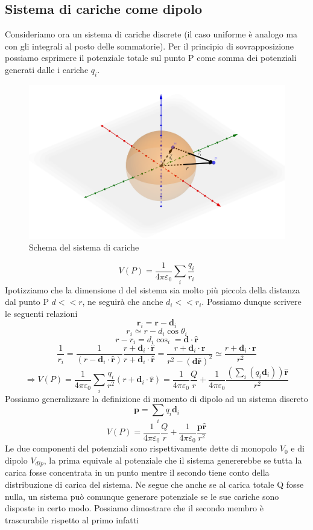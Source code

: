 \documentclass[
10pt, %
a4paper, %
oneside, %
headinclude,footinclude, %
BCOR5mm, %
]{scrartcl}
\begin{document}
\subsection{Sistema di cariche come dipolo}
Consideriamo ora un sistema di cariche discrete (il caso uniforme è analogo ma con gli integrali al posto delle sommatorie). Per il principio di sovrapposizione possiamo esprimere il potenziale totale sul punto P come somma dei potenziali generati dalle i cariche \(q_i\).
\begin{figure}[h!]
	\centering
	\includegraphics[width=0.9\linewidth]{../images/sistema_dipolo}
	\caption{Schema del sistema di cariche}
	\label{fig:sistemadipolo}
\end{figure}
\FloatBarrier
\[V(P) = \frac{1}{4\pi\varepsilon_0}\sum_i \frac{q_i}{r_i}\]
Ipotizziamo che la dimensione d del sistema sia molto più piccola della distanza dal punto P \(d<<r\), ne seguirà che anche \(d_i<<r_i\). Possiamo dunque scrivere le seguenti relazioni
 \[\mathbf{r}_i = \mathbf{r} - \mathbf{d}_i\]
 \[r_i \simeq r-d_i\cos\theta_i\]
 \[r-r_i = d_i\cos_i = \mathbf{d}\cdot\hat{\mathbf{r}}\]
 \[\frac{1}{r_i} = \frac{1}{(r-\mathbf{d}_i\cdot\hat{\mathbf{r}})}\frac{r+\mathbf{d}_i\cdot\hat{\mathbf{r}}}{r+\mathbf{d}_i\cdot\hat{\mathbf{r}}} = \frac{r+\mathbf{d}_i\cdot\mathbf{r}}{r^2-(\mathbf{d}\hat{\mathbf{r}})^2} \simeq \frac{r+\mathbf{d}_i\cdot\mathbf{r}}{r^2}\]
 \[\Rightarrow V(P) =\frac{1}{4\pi\varepsilon_0}\sum_i \frac{q_i}{r^2}(r+\mathbf{d}_i\cdot\hat{\mathbf{r}}) = \frac{1}{4\pi\varepsilon_0}\frac{Q}{r}+\frac{1}{4\pi\varepsilon_0}\frac{(\sum_i(q_i\mathbf{d}_i))\hat{\mathbf{r}}}{r^2}\]
 Possiamo generalizzare la definizione di momento di dipolo ad un sistema discreto 
 \[\mathbf{p} = \sum_i q_i\mathbf{d}_i\]
 \[V(P) = \frac{1}{4\pi\varepsilon_0}\frac{Q}{r}+\frac{1}{4\pi\varepsilon_0}\frac{\mathbf{p}\hat{\mathbf{r}}}{r^2}\]
 Le due componenti del potenziali sono rispettivamente dette di monopolo \(V_0\) e di dipolo \(V_{dip}\), la prima equivale al potenziale che il sistema genererebbe se tutta la carica fosse concentrata in un punto mentre il secondo tiene conto della distribuzione di carica del sistema. Ne segue che anche se al carica totale Q fosse nulla, un sistema può comunque generare potenziale se le sue cariche sono disposte in certo modo. Possiamo dimostrare che il secondo membro è trascurabile rispetto al primo infatti
\end{document}
